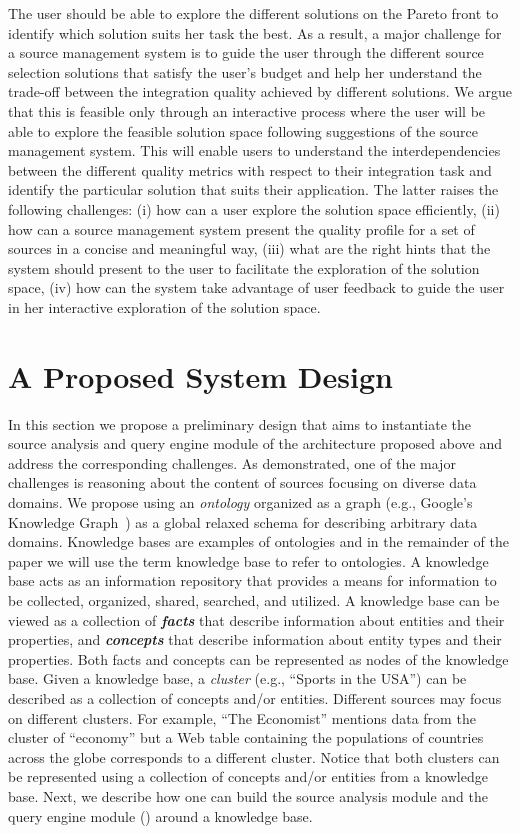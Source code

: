 \documentclass{sig-alternate}
\begin{document}
The user should be able to explore the different solutions on the Pareto front to identify which solution suits her task the best.  As a result, a major challenge for a source management system is to guide the user through the different source selection solutions that satisfy the user's budget and help her understand the trade-off between the integration quality achieved by different solutions. We argue that this is feasible only through an interactive process where the user will be able to explore the feasible solution space following suggestions of the source management system. This will enable users to understand the interdependencies between the different quality metrics with respect to their integration task and identify the particular solution that suits their application. The latter raises the following challenges: (i) how can a user explore the solution space efficiently, (ii) how can a source management system present the quality profile for a set of sources in a concise and meaningful way, (iii) what are the right hints that the system should present to the user to facilitate the exploration of the solution space, (iv) how can the system take advantage of user feedback to guide the user in her interactive exploration of the solution space. 

\section{A Proposed System Design}
\label{sec:corgraph}
In this section we propose a preliminary design that aims to instantiate the source analysis and query engine module of the architecture proposed above and address the corresponding challenges. As demonstrated, one of the major challenges is reasoning about the content of sources focusing on diverse data domains. We propose using an {\em ontology} organized as a graph (e.g., Google's Knowledge Graph~\cite{kg}) as a global relaxed schema for describing arbitrary data domains. Knowledge bases are examples of ontologies and in the remainder of the paper we will use the term knowledge base to refer to ontologies. A knowledge base acts as an information repository that provides a means for information to be collected, organized, shared, searched, and utilized. A knowledge base can be viewed as a collection of {\bf {\em facts}} that describe information about entities and their properties, and {\bf {\em concepts}} that describe information about entity types and their properties. Both facts and concepts can be represented as nodes of the knowledge base. Given a knowledge base, a {\em cluster} (e.g., ``Sports in the USA'') can be described as a collection of concepts and/or entities. Different sources may focus on different clusters. For example, ``The Economist'' mentions data from the cluster of  ``economy'' but a Web table containing the populations of countries across the globe corresponds to a different cluster. Notice that both clusters can be represented using a collection of concepts and/or entities from a knowledge base.  Next, we describe how one can build the source analysis module and the query engine module () around a knowledge base.
\end{document}
